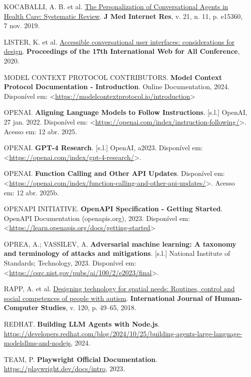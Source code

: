 \documentclass[
]{article}
\newlength{\cslhangindent}
\newenvironment{CSLReferences}[2] %
 {\begin{list}{}{%
  \setlength{\itemindent}{0pt}
  \setlength{\leftmargin}{0pt}
  \setlength{\parsep}{0pt}
  \ifodd #1
   \setlength{\leftmargin}{\cslhangindent}
   \setlength{\itemindent}{-1\cslhangindent}
  \fi
  \setlength{\itemsep}{#2\baselineskip}}}
 {\end{list}}
\begin{document}
\begin{CSLReferences}{0}{1}
KOCABALLI, A. B. et al. \href{https://doi.org/10.2196/15360}{The
Personalization of Conversational Agents in Health Care: Systematic
Review}. \textbf{J Med Internet Res}, v. 21, n. 11, p. e15360, 7 nov.
2019.

LISTER, K. et al.
\href{https://api.semanticscholar.org/CorpusID:218539971}{Accessible
conversational user interfaces: considerations for design}.
\textbf{Proceedings of the 17th International Web for All Conference},
2020.

MODEL CONTEXT PROTOCOL CONTRIBUTORS. \textbf{{Model Context Protocol
Documentation - Introduction}}. Online Documentation, 2024. Disponível
em:
\textless{}\url{https://modelcontextprotocol.io/introduction}\textgreater{}

OPENAI. \textbf{Aligning Language Models to Follow Instructions}.
{[}s.l.{]} OpenAI, 27 jan. 2022. Disponível em:
\textless{}\url{https://openai.com/index/instruction-following/}\textgreater.
Acesso em: 12 abr. 2025.

OPENAI. \textbf{GPT-4 Research}. {[}s.l.{]} OpenAI, a2023. Disponível
em:
\textless{}\url{https://openai.com/index/gpt-4-research/}\textgreater.

OPENAI. \textbf{Function Calling and Other API Updates}. Disponível em:
\textless{}\url{https://openai.com/index/function-calling-and-other-api-updates/}\textgreater.
Acesso em: 12 abr. 2025b.

OPENAPI INITIATIVE. \textbf{{OpenAPI Specification - Getting Started}}.
OpenAPI Documentation (openapis.org), 2023. Disponível em:
\textless{}\url{https://learn.openapis.org/docs/getting-started}\textgreater{}

OPREA, A.; VASSILEV, A. \textbf{Adversarial machine learning: A taxonomy
and terminology of attacks and mitigations}. {[}s.l.{]} National
Institute of Standards; Technology, 2023. Disponível em:
\textless{}\url{https://csrc.nist.gov/pubs/ai/100/2/e2023/final}\textgreater.

RAPP, A. et al.
\href{https://doi.org/10.1016/j.ijhcs.2018.07.005}{Designing technology
for spatial needs: Routines, control and social competences of people
with autism}. \textbf{International Journal of Human-Computer Studies},
v. 120, p. 49--65, 2018.

REDHAT. \textbf{Building LLM Agents with Node.js}.
\url{https://developers.redhat.com/blog/2024/10/25/building-agents-large-language-modelsllms-and-nodejs},
2024.

TEAM, P. \textbf{Playwright Official Documentation}.
\url{https://playwright.dev/docs/intro}, 2023.

\end{CSLReferences}
\end{document}
